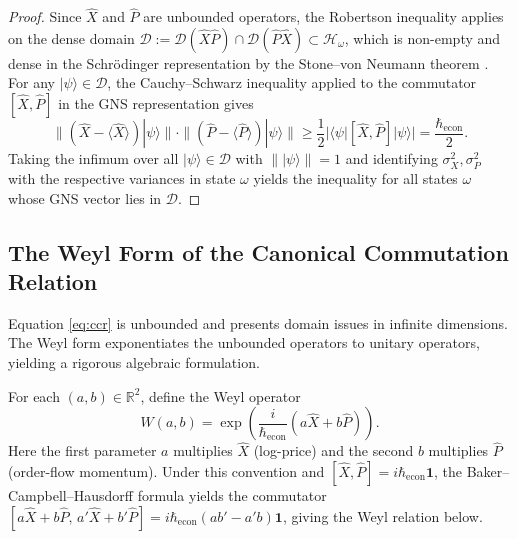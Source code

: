\begin{proof}
Since $\hat{X}$ and $\hat{P}$ are unbounded operators, the Robertson
inequality applies on the dense domain
$\mathcal{D} := \mathcal{D}(\hat{X}\hat{P}) \cap \mathcal{D}(\hat{P}\hat{X})
\subset \mathcal{H}_\omega$, which is non-empty and dense in the Schr\"{o}dinger
representation by the Stone--von Neumann theorem \citep{vonNeumann1931}. For
any $|\psi\rangle \in \mathcal{D}$, the Cauchy--Schwarz inequality applied
to the commutator $[\hat{X}, \hat{P}]$ in the GNS representation gives
\begin{equation*}
    \|(\hat{X} - \langle \hat{X} \rangle)|\psi\rangle\| \cdot
    \|(\hat{P} - \langle \hat{P} \rangle)|\psi\rangle\|
    \geq \frac{1}{2} |\langle \psi | [\hat{X}, \hat{P}] | \psi \rangle|
    = \frac{\hbar_{\mathrm{econ}}}{2}.
\end{equation*}
Taking the infimum over all $|\psi\rangle \in \mathcal{D}$ with
$\||\psi\rangle\| = 1$ and identifying $\sigma_X^2, \sigma_P^2$ with the
respective variances in state $\omega$ yields the inequality for all states
$\omega$ whose GNS vector lies in $\mathcal{D}$.
\end{proof}

\subsection{The Weyl Form of the Canonical Commutation Relation}

Equation \eqref{eq:ccr} is unbounded and presents domain issues in infinite
dimensions. The Weyl form exponentiates the unbounded operators to unitary operators,
yielding a rigorous algebraic formulation.

\begin{definition}\label{def:weyl-ops}
For each $(a, b) \in \mathbb{R}^2$, define the Weyl operator
\begin{equation}\label{eq:weyl-op}
    W(a, b) = \exp\!\left(\frac{i}{\hbar_{\mathrm{econ}}} (a\hat{X} + b\hat{P})\right).
\end{equation}
Here the first parameter $a$ multiplies $\hat{X}$ (log-price) and the second
$b$ multiplies $\hat{P}$ (order-flow momentum). Under this convention and
$[\hat{X},\hat{P}]=i\hbar_{\mathrm{econ}}\mathbf{1}$, the Baker--Campbell--Hausdorff
formula yields the commutator
$[a\hat{X}+b\hat{P},\,a'\hat{X}+b'\hat{P}] = i\hbar_{\mathrm{econ}}(ab'-a'b)\mathbf{1}$,
giving the Weyl relation below.
\end{definition}

